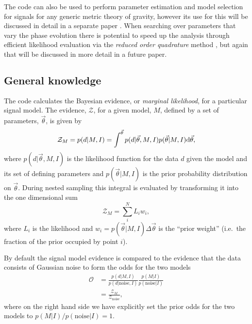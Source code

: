 The code can also be used to perform parameter estimation and model selection for signals for any generic
metric theory of gravity, however its use for this will be discussed in detail in a separate paper \citep{MaxCWpolariations}. When
searching over parameters that vary the phase evolution there is potential to speed up the analysis through
efficient likelihood evaluation via the {\it reduced order quadrature} method \citep[see, e.g.,][]{2014PhRvX...4c1006F,2015PhRvL.114g1104C},
but again that will be discussed in more detail in a future paper.

\subsection{General knowledge}\label{sec:general}

The code calculates the Bayesian evidence, or {\it marginal likelihood}, for a particular signal model. The
evidence, $\mathcal{Z}$, for a given model, $M$, defined by a set of parameters, $\vec{\theta}$, is given by
\begin{equation}\label{eq:evidence}
\mathcal{Z}_M = p(d|M,I) = \int^{\vec{\theta}} p(d|\vec{\theta},M,I)p(\vec{\theta}|M,I) {\rm d}\vec{\theta},
\end{equation}
where $p(d|\vec{\theta},M,I)$ is the likelihood function for the data $d$ given the
model and its set of defining parameters and $p(\vec{\theta}|M,I)$ is the prior probability distribution on
$\vec{\theta}$. During nested sampling this integral is evaluated by transforming it into the one dimensional
sum
\begin{equation}\label{eq:nestedsampev}
\mathcal{Z}_M = \sum_i^N L_i w_i,
\end{equation}
where $L_i$ is the likelihood and $w_i = p(\vec{\theta}|M,I) \Delta\vec{\theta}$ is the ``prior weight''
(i.e.\ the fraction of the prior occupied by point $i$).

By default the signal model evidence is compared to the evidence that the data consists of Gaussian noise to form the odds for the two models
\begin{align}\label{eq:oddsratio}
\mathcal{O} &= \frac{p(d|M,I)}{p(d|\text{noise},I)}\frac{p(M|I)}{p(\text{noise}|I)} \nonumber \\
&= \frac{\mathcal{Z}_M}{\mathcal{Z}_{\text{noise}}},
\end{align}
where on the right hand side we have explicitly set the prior odds for the two models to
$p(M|I)/p(\text{noise}|I) = 1$.

